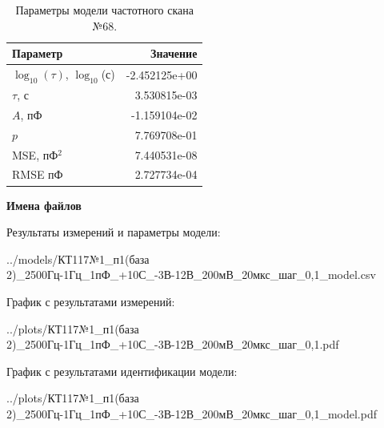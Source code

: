 \begin{table}[!ht]
    \centering
    \caption{Параметры модели частотного скана №68.}
    \begin{tabular}{|l|r|}
        \hline
        Параметр                                       & Значение                  \\ \hline
        $\log_{10}(\tau)$, $\log_{10}$(с)              & -2.452125e+00             \\ \hline
        $\tau$, с                                      & 3.530815e-03              \\ \hline
        $A$, пФ                                        & -1.159104e-02             \\ \hline
        $p$                                            & 7.769708e-01              \\ \hline
        MSE, пФ$^2$                                    & 7.440531e-08              \\ \hline
        RMSE пФ                                        & 2.727734e-04              \\ \hline
    \end{tabular}
    \label{table:frequency_scan_model_68}
\end{table}

\textbf{Имена файлов}

Результаты измерений и параметры модели:

\scriptsize../models/КТ117№1\_п1(база 2)\_2500Гц-1Гц\_1пФ\_+10С\_-3В-12В\_200мВ\_20мкс\_шаг\_0,1\_model.csv
\normalsize

График с результатами измерений:

\scriptsize../plots/КТ117№1\_п1(база 2)\_2500Гц-1Гц\_1пФ\_+10С\_-3В-12В\_200мВ\_20мкс\_шаг\_0,1.pdf
\normalsize

График с результатами идентификации модели:

\scriptsize../plots/КТ117№1\_п1(база 2)\_2500Гц-1Гц\_1пФ\_+10С\_-3В-12В\_200мВ\_20мкс\_шаг\_0,1\_model.pdf
\normalsize

